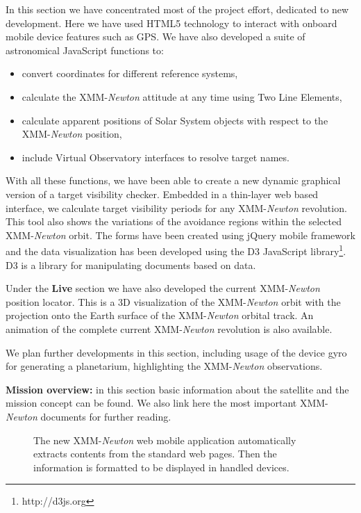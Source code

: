 In this section we have concentrated most of the project effort, dedicated to new development. Here we have used HTML5 technology to interact with onboard mobile device features such as GPS. We have also developed a suite of astronomical JavaScript functions to: 
\begin{itemize}
\item convert coordinates for different reference systems,
\item calculate the XMM-{\em Newton} attitude at any time using Two Line Elements,
\item calculate apparent positions of Solar System objects with respect to the XMM-{\em Newton} position,
\item include Virtual Observatory interfaces to resolve target names.
\end{itemize}

With all these functions, we have been able to create a new dynamic graphical version of a target visibility checker. Embedded in a thin-layer web based interface, we calculate target visibility periods for any XMM-{\em Newton} revolution. This tool also shows the variations of the avoidance regions within the selected XMM-{\em Newton} orbit. The forms have been created using jQuery mobile framework and the data visualization has been developed using the D3 JavaScript library\footnote{http://d3js.org}. D3 is a library for manipulating documents based on data. 

Under the {\bf Live} section we have also developed the current XMM-{\em Newton} position locator. This is a 3D visualization of the XMM-{\em Newton} orbit with the projection onto the Earth surface of the XMM-{\em Newton} orbital track. An animation of the complete current XMM-{\em Newton} revolution is also available.

We plan further developments in this section, including usage of the device gyro for generating a planetarium, highlighting the XMM-{\em Newton} observations.

{\bf Mission overview:} in this section basic information about the satellite and the mission concept can be found. We also link here the most important XMM-{\em Newton} documents for further reading. 

\begin{figure}[h]
\caption{ The new XMM-{\em Newton} web mobile application automatically extracts contents from the standard web pages. Then the information is formatted to be displayed in handled devices.} \label{P061-fig-1}
\end{figure}


